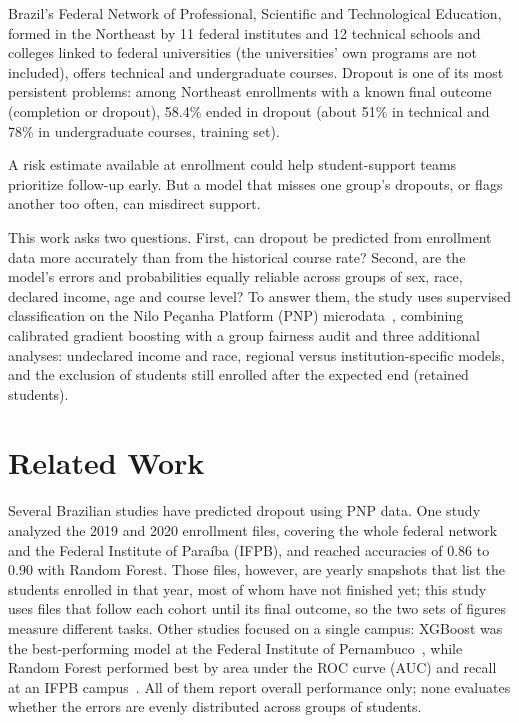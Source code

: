 \documentclass[12pt]{article}
\begin{document}
Brazil's Federal Network of Professional, Scientific and Technological Education, formed in the Northeast by
11 federal institutes and 12 technical schools and colleges linked to federal universities (the universities' own
programs are not included), offers technical and undergraduate courses. Dropout is one of its most persistent
problems: among Northeast enrollments with a known final outcome (completion or dropout), 58.4\% ended in dropout (about 51\% in technical and 78\% in undergraduate courses, training set). 

A risk estimate available at enrollment could help student-support teams prioritize follow-up early. But a model that misses one group's dropouts, or flags another too often, can misdirect support.

This work asks two questions. First, can dropout be predicted from enrollment data more accurately than from
the historical course rate? Second, are the model's errors and probabilities equally reliable across groups of
sex, race, declared income, age and course level? To answer them, the study uses supervised classification on the Nilo Peçanha
Platform (PNP) microdata~\cite{pnp}, combining calibrated gradient boosting with a group fairness audit and three
additional analyses: undeclared income and race, regional versus institution-specific models, and the exclusion of
students still enrolled after the expected end (retained students).

\section{Related Work}

Several Brazilian studies have predicted dropout using PNP data. One study~\cite{oliveira2022} analyzed the 2019 and
2020 enrollment files, covering the whole federal network and the Federal Institute of Paraíba (IFPB), and reached
accuracies of 0.86 to 0.90 with Random Forest. Those files, however, are yearly snapshots that list the students
enrolled in that year, most of whom have not finished yet; this study uses files that follow each cohort until its
final outcome, so the two sets of figures measure different tasks. Other studies focused on a single campus:
XGBoost was the best-performing model at the Federal Institute of Pernambuco~\cite{barbosa2023}, while Random
Forest performed best by area under the ROC curve (AUC) and recall at an IFPB campus~\cite{cabral2025}. All of them report overall performance only; none evaluates whether the errors are evenly distributed
across groups of students.
\end{document}
